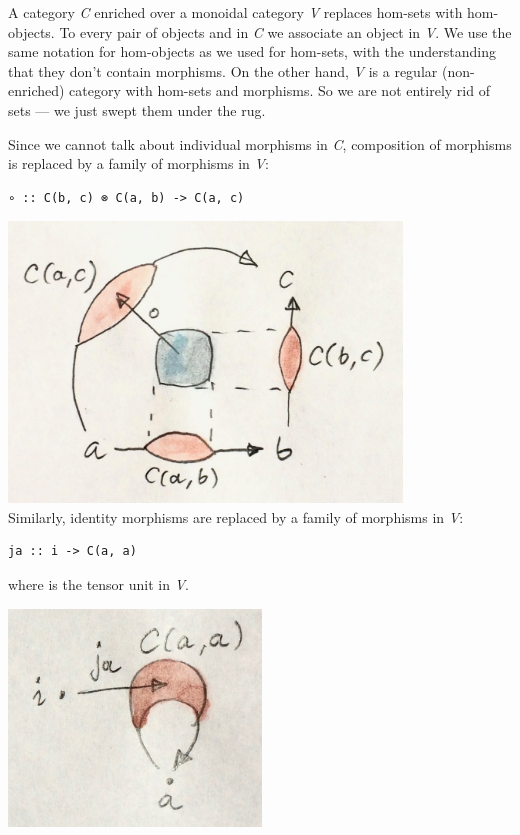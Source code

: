 A category \emph{C} enriched over a monoidal category \emph{V} replaces
hom-sets with hom-objects. To every pair of objects  and
 in \emph{C} we associate an object  in
\emph{V}. We use the same notation for hom-objects as we used for
hom-sets, with the understanding that they don't contain morphisms. On
the other hand, \emph{V} is a regular (non-enriched) category with
hom-sets and morphisms. So we are not entirely rid of sets --- we just
swept them under the rug.

Since we cannot talk about individual morphisms in \emph{C}, composition
of morphisms is replaced by a family of morphisms in \emph{V}:

\begin{verbatim}
∘ :: C(b, c) ⊗ C(a, b) -> C(a, c)
\end{verbatim}

\includegraphics[width=4.11458in]{images/composition.jpg}\\
Similarly, identity morphisms are replaced by a family of morphisms in
\emph{V}:

\begin{verbatim}
ja :: i -> C(a, a)
\end{verbatim}

where  is the tensor unit in \emph{V}.

\includegraphics[width=2.64583in]{images/id.jpg}

